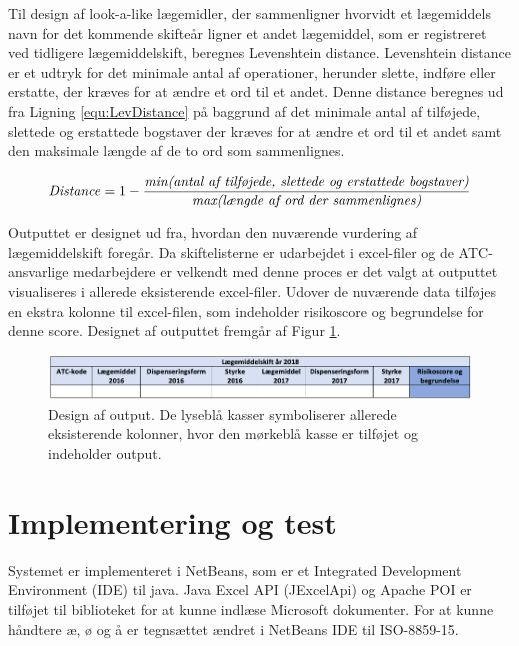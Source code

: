 Til design af look-a-like lægemidler, der sammenligner hvorvidt et lægemiddels navn for det kommende skifteår ligner et andet lægemiddel, som er registreret ved tidligere lægemiddelskift, beregnes Levenshtein distance. Levenshtein distance er et udtryk for det minimale antal af operationer, herunder slette, indføre eller erstatte, der kræves for at ændre et ord til et andet. Denne distance beregnes ud fra Ligning \ref{equ:LevDistance} på baggrund af det minimale antal af tilføjede, slettede og erstattede bogstaver der kræves for at ændre et ord til et andet samt den maksimale længde af de to ord som sammenlignes. 

\begin{equation} \label{equ:LevDistance}
\mbox{\textit{Distance}} = 1 - \frac{\mbox{\textit{min(antal af tilføjede, slettede og erstattede bogstaver)}}}{\mbox{\textit{max(længde af ord der sammenlignes)}}}   
\end{equation}

Outputtet er designet ud fra, hvordan den nuværende vurdering af lægemiddelskift foregår. Da skiftelisterne er udarbejdet i excel-filer og de ATC-ansvarlige medarbejdere er velkendt med denne proces er det valgt at outputtet visualiseres i allerede eksisterende excel-filer. Udover de nuværende data tilføjes en ekstra kolonne til excel-filen, som indeholder risikoscore og begrundelse for denne score. Designet af outputtet fremgår af Figur \ref{fig:Output}.

\begin{figure}[H]\centering
\includegraphics[width=1\textwidth]{billeder/Output.png} 
	\caption{Design af output. De lyseblå kasser symboliserer allerede eksisterende kolonner, hvor den mørkeblå kasse er tilføjet og indeholder output.}
	\label{fig:Output}  
\end{figure}

\newpage
\section{Implementering og test}
Systemet er implementeret i NetBeans, som er et Integrated Development Environment (IDE) til java.  Java Excel API (JExcelApi) og Apache POI er tilføjet til biblioteket for at kunne indlæse Microsoft dokumenter. For at kunne håndtere æ, ø og å er tegnsættet ændret i NetBeans IDE til ISO-8859-15.

